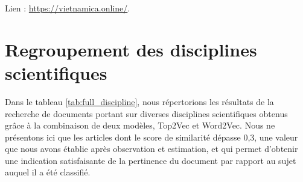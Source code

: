\bigskip

Lien : \url{https://vietnamica.online/}.

\bigskip

\newpage 
\section{Regroupement des disciplines scientifiques}
Dans le tableau \ref{tab:full_discipline}, nous répertorions les résultats de la recherche de documents portant sur diverses disciplines scientifiques obtenus grâce à la combinaison de deux modèles, Top2Vec et Word2Vec. Nous ne présentons ici que les articles dont le score de similarité dépasse 0,3, une valeur que nous avons établie après observation et estimation, et qui permet d'obtenir une indication satisfaisante de la pertinence du document par rapport au sujet auquel il a été classifié.

